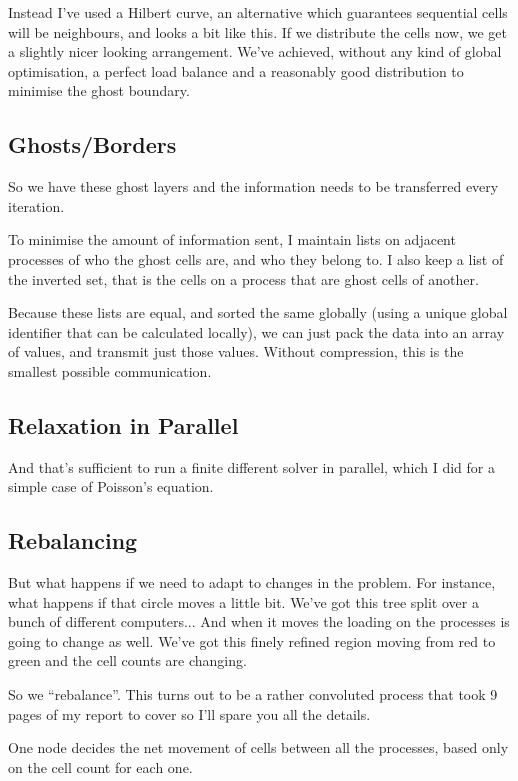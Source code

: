 \documentclass[10pt]{article}
\begin{document}
    	Instead I've used a Hilbert curve, an alternative which guarantees sequential cells will be neighbours, and looks a bit like this. If we distribute the cells now, we get a slightly nicer looking arrangement. We've achieved, without any kind of global optimisation, a perfect load balance and a reasonably good distribution to minimise the ghost boundary. 
    

    \subsection{Ghosts/Borders}
    	So we have these ghost layers and the information needs to be transferred every iteration. 
    	
    	To minimise the amount of information sent, I maintain lists on adjacent processes of who the ghost cells are, and who they belong to. I also keep a list of the inverted set, that is the cells on a process that are ghost cells of another. 
    	
    	Because these lists are equal, and sorted the same globally (using a unique global identifier that can be calculated locally), we can just pack the data into an array of values, and transmit just those values. Without compression, this is the smallest possible communication. 
		

    \subsection{Relaxation in Parallel}
    	And that's sufficient to run a finite different solver in parallel, which I did for a simple case of Poisson's equation. 


    \subsection{Rebalancing}
    	But what happens if we need to adapt to changes in the problem. For instance, what happens if that circle moves a little bit. We've got this tree split over a bunch of different computers... And when it moves the loading on the processes is going to change as well. We've got this finely refined region moving from red to green and the cell counts are changing. 
    	
    	So we ``rebalance''. This turns out to be a rather convoluted process that took 9 pages of my report to cover so I'll spare you all the details.
    	
    	One node decides the net movement of cells between all the processes, based only on the cell count for each one. 
    	
\end{document}
